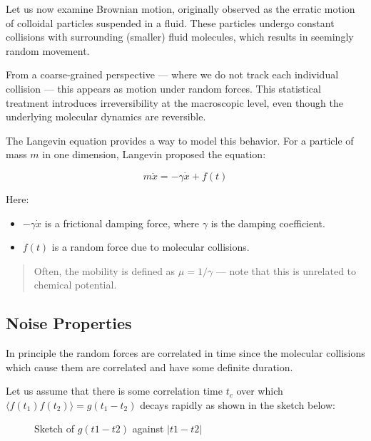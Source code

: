 \documentclass[
  letterpaper,
  enabledeprecatedfontcommands]{report}
\providecommand{\tightlist}{%
  \setlength{\itemsep}{0pt}\setlength{\parskip}{0pt}}
\begin{document}
Let us now examine Brownian motion, originally observed as the erratic
motion of colloidal particles suspended in a fluid. These particles
undergo constant collisions with surrounding (smaller) fluid molecules,
which results in seemingly random movement.

From a coarse-grained perspective --- where we do not track each
individual collision --- this appears as motion under random forces.
This statistical treatment introduces irreversibility at the macroscopic
level, even though the underlying molecular dynamics are reversible.

The Langevin equation provides a way to model this behavior. For a
particle of mass \(m\) in one dimension, Langevin proposed the equation:

\[
m \ddot{x} = -\gamma \dot{x} + f(t)
\]

Here:

\begin{itemize}
\tightlist
\item
  \(-\gamma \dot{x}\) is a frictional damping force, where \(\gamma\) is
  the damping coefficient.
\item
  \(f(t)\) is a random force due to molecular collisions.
\end{itemize}

\begin{quote}
Often, the mobility is defined as \(\mu = 1/\gamma\) --- note that this
is unrelated to chemical potential.
\end{quote}

\subsection{Noise Properties}\label{noise-properties}

In principle the random forces are correlated in time since the
molecular collisions which cause them are correlated and have some
definite duration.

Let us assume that there is some correlation time \(t_c\) over which
\(\langle f(t_1) f(t_2) \rangle = g(t_1 - t_2)\) decays rapidly as shown
in the sketch below:

\begin{figure}


\caption{\label{fig-autocorrelate}Sketch of \(g(t1−t2)\) against
\(|t1− t2|\)}

\end{figure}%
\end{document}
